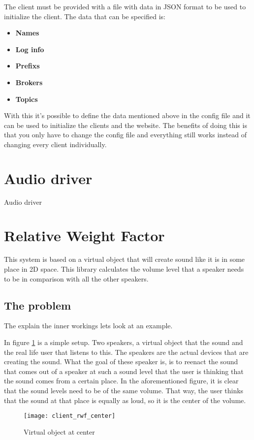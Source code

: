 The client must be provided with a file with data in JSON format to be used to initialize the client. The data that can be specified is:
\small{
\begin{itemize} [noitemsep, nolistsep]
	\item \textbf {Names}
	\item \textbf {Log info}
	\item \textbf {Prefixs}
	\item \textbf {Brokers}
	\item \textbf {Topics\\}
\end{itemize}
}
With this it's possible to define the data mentioned above in the config file and it can be used to initialize the clients and the website. The benefits of doing this is that you only have to change the config file and everything still works instead of changing every client individually.

\section{Audio driver}
\label{sec:client_audio_driver}
Audio driver

\section{Relative Weight Factor}
\label{sec:client_relative_weight_factor}

This system is based on a virtual object that will create sound like it is in some place in 2D space.
This library calculates the volume level that a speaker needs to be in comparison with all the other speakers.

\subsection{The problem}
\label{sub:client_rwf_the_problem}

The explain the inner workings lets look at an example.

In figure \ref{fig:client_rwf_center} is a simple setup. Two speakers, a virtual object that  the sound and the real life user that listens to this.
The speakers are the actual devices that are creating the sound.
What the goal of these speaker is, is to reenact the sound that comes out of a speaker at such a sound level that the user is thinking that the sound comes from a certain place.
In the aforementioned figure, it is clear that the sound levels need to be of the same volume.
That way, the user thinks that the sound at that place is equally as loud, so it is the center of the volume.
\begin{figure}[H]
    \centering
    \texttt{[image: client\_rwf\_center]}
    \caption{Virtual object at center}
    \label{fig:client_rwf_center}
\end{figure}

